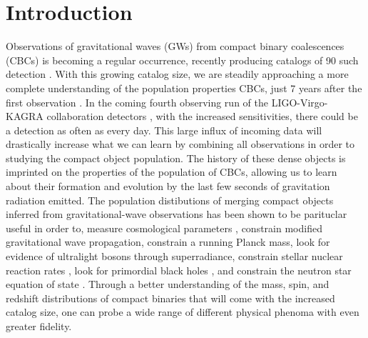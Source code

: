 \section{Introduction} \label{sec:intro}

Observations of gravitational waves (GWs) from compact binary coalescences (CBCs) is becoming a regular occurrence, 
recently producing catalogs of 90 such detection \cite{GWTC1,gwtc2,GWTC3}. With this growing catalog size, we are steadily approaching a more complete  
understanding of the population properties CBCs, just 7 years after the first observation \cite{o1o2_pop,o3a_pop,o3b_astro_dist}. 
In the coming fourth observing run of the LIGO-Virgo-KAGRA collaboration detectors \cite{aLIGO,aVIRGO, KAGRA}, with the increased sensitivities, 
there could be a detection as often as every day. This large influx of incoming data will drastically increase what we can learn by combining all observations
in order to studying the compact object population. The history of these dense objects is imprinted on the properties of the population 
of CBCs, allowing us to learn about their formation and evolution by the last few seconds of gravitation radiation emitted. The population distibutions 
of merging compact objects inferred from gravitational-wave observations has been shown to be parituclar useful in order to, measure cosmological parameters \citep{Farr_2019HUB}, 
constrain modified gravitational wave propagation, constrain a running Planck mass, look for evidence of ultralight bosons through superradiance, 
constrain stellar nuclear reaction rates \cite{Farmer_2020}, look for primordial black holes \cite{Ng_2021}, and constrain the neutron star equation of state . 
Through a better understanding of the mass, spin, and redshift distributions of compact binaries that will come with the increased catalog size, 
one can probe a wide range of different physical phenoma with even greater fidelity.

